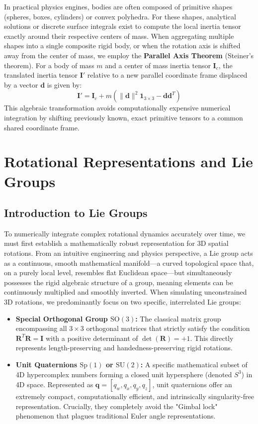 In practical physics engines, bodies are often composed of primitive shapes (spheres, boxes, cylinders) or convex polyhedra. For these shapes, analytical solutions or discrete surface integrals exist to compute the local inertia tensor exactly around their respective centers of mass. When aggregating multiple shapes into a single composite rigid body, or when the rotation axis is shifted away from the center of mass, we employ the \textbf{Parallel Axis Theorem} (Steiner's theorem). For a body of mass $m$ and a center of mass inertia tensor $\bm{I}_c$, the translated inertia tensor $\bm{I}'$ relative to a new parallel coordinate frame displaced by a vector $\bm{d}$ is given by:
\begin{equation}
    \bm{I}' = \bm{I}_c + m \left( \|\bm{d}\|^2 \bm{1}_{3\times3} - \bm{d}\bm{d}^T \right)
\end{equation}
This algebraic transformation avoids computationally expensive numerical integration by shifting previously known, exact primitive tensors to a common shared coordinate frame.

\section{Rotational Representations and Lie Groups}

\subsection{Introduction to Lie Groups}
To numerically integrate complex rotational dynamics accurately over time, we must first establish a mathematically robust representation for 3D spatial rotations. From an intuitive engineering and physics perspective, a Lie group acts as a continuous, smooth mathematical manifold—a curved topological space that, on a purely local level, resembles flat Euclidean space—but simultaneously possesses the rigid algebraic structure of a group, meaning elements can be continuously multiplied and smoothly inverted. 
When simulating unconstrained 3D rotations, we predominantly focus on two specific, interrelated Lie groups:
\begin{itemize}
    \item \textbf{Special Orthogonal Group $\text{SO}(3)$:} The classical matrix group encompassing all $3 \times 3$ orthogonal matrices that strictly satisfy the condition $\bm{R}^T\bm{R} = \bm{I}$ with a positive determinant of $\det(\bm{R}) = +1$. This directly represents length-preserving and handedness-preserving rigid rotations.
    \item \textbf{Unit Quaternions $\text{Sp}(1)$ or $\text{SU}(2)$:} A specific mathematical subset of 4D hypercomplex numbers forming a closed unit hypersphere (denoted $S^3$) in 4D space. Represented as $\bm{q} = [q_w, q_x, q_y, q_z]$, unit quaternions offer an extremely compact, computationally efficient, and intrinsically singularity-free representation. Crucially, they completely avoid the "Gimbal lock" phenomenon that plagues traditional Euler angle representations.
\end{itemize}


